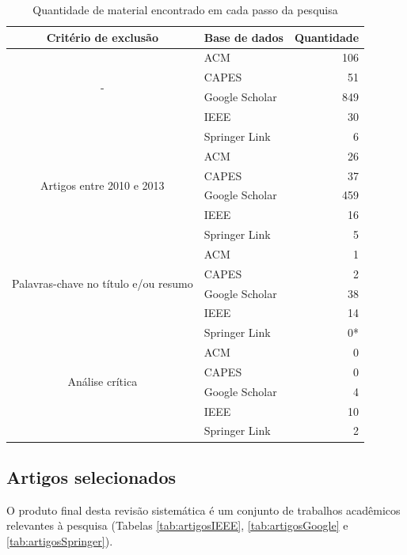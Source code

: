 \begin{table}[H]
	\centering
	\begin{tabular}{| c | l | r |} \hline \textbf{Critério de exclusão} & \textbf{Base de dados}  & \textbf{Quantidade} \\ \hline
		\multirow{4}{*}{-}
			& ACM & 106 \\ \cline{2-3}
			& CAPES & 51 \\ \cline{2-3}
			& Google Scholar & 849 \\ \cline{2-3}
			& IEEE & 30 \\ \cline{2-3}
			& Springer Link & 6 \\ \cline{2-3}
		\hline \hline
		\multirow{4}{*}{Artigos entre 2010 e 2013} 
			& ACM & 26 \\ \cline{2-3}
			& CAPES & 37 \\ \cline{2-3}
			& Google Scholar & 459 \\ \cline{2-3}
			& IEEE & 16 \\ \cline{2-3}
			& Springer Link & 5 \\ \cline{2-3}
		\hline \hline
		\multirow{4}{*}{Palavras-chave no título e/ou resumo} 
			& ACM & 1 \\ \cline{2-3}
			& CAPES & 2 \\ \cline{2-3}
			& Google Scholar & 38 \\ \cline{2-3}
			& IEEE & 14 \\ \cline{2-3}
			& Springer Link & 0* \\ \cline{2-3}
		\hline \hline
		\multirow{4}{*}{Análise crítica}
			& ACM & 0 \\ \cline{2-3}
			& CAPES & 0 \\ \cline{2-3}
			& Google Scholar & 4 \\ \cline{2-3}
			& IEEE & 10 \\ \cline{2-3}
			& Springer Link & 2 \\ \cline{2-3}
		\hline
	\end{tabular}
	\captionsetup{justification=centering}
	\caption{Quantidade de material encontrado em cada passo da pesquisa}
	\label{tab:quantidadeDeMateriais}
\end{table}

\subsection{Artigos selecionados}

O produto final desta revisão sistemática é um conjunto de trabalhos acadêmicos relevantes à pesquisa (Tabelas \ref{tab:artigosIEEE}, \ref{tab:artigosGoogle} e \ref{tab:artigosSpringer}).


